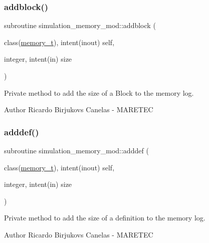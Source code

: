 \subsubsection{\texorpdfstring{addblock()}{addblock()}}
{\footnotesize\ttfamily subroutine simulation\+\_\+memory\+\_\+mod\+::addblock (\begin{DoxyParamCaption}\item[{class(\hyperlink{structsimulation__memory__mod_1_1memory__t}{memory\+\_\+t}), intent(inout)}]{self,  }\item[{integer, intent(in)}]{size }\end{DoxyParamCaption})\hspace{0.3cm}{\ttfamily [private]}}



Private method to add the size of a Block to the memory log. 

\begin{DoxyAuthor}{Author}
Ricardo Birjukovs Canelas -\/ M\+A\+R\+E\+T\+EC 
\end{DoxyAuthor}
\mbox{\label{namespacesimulation__memory__mod_ac6d6853bc462947d24a8f6234d625138}} 
\subsubsection{\texorpdfstring{adddef()}{adddef()}}
{\footnotesize\ttfamily subroutine simulation\+\_\+memory\+\_\+mod\+::adddef (\begin{DoxyParamCaption}\item[{class(\hyperlink{structsimulation__memory__mod_1_1memory__t}{memory\+\_\+t}), intent(inout)}]{self,  }\item[{integer, intent(in)}]{size }\end{DoxyParamCaption})\hspace{0.3cm}{\ttfamily [private]}}



Private method to add the size of a definition to the memory log. 

\begin{DoxyAuthor}{Author}
Ricardo Birjukovs Canelas -\/ M\+A\+R\+E\+T\+EC 
\end{DoxyAuthor}
\mbox{\label{namespacesimulation__memory__mod_a940ff42fa3a49423f9ac98da2bffa54c}} 
